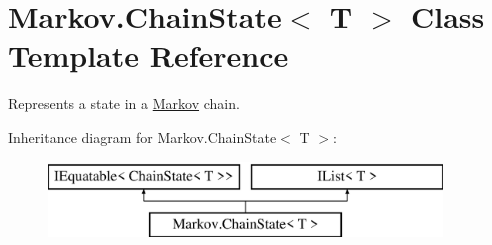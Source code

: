 \hypertarget{class_markov_1_1_chain_state}{}\section{Markov.\+Chain\+State$<$ T $>$ Class Template Reference}
\label{class_markov_1_1_chain_state}


Represents a state in a \mbox{\hyperlink{namespace_markov}{Markov}} chain.  


Inheritance diagram for Markov.\+Chain\+State$<$ T $>$\+:\begin{figure}[H]
\begin{center}
\leavevmode
\includegraphics[height=2.000000cm]{class_markov_1_1_chain_state}
\end{center}
\end{figure}
